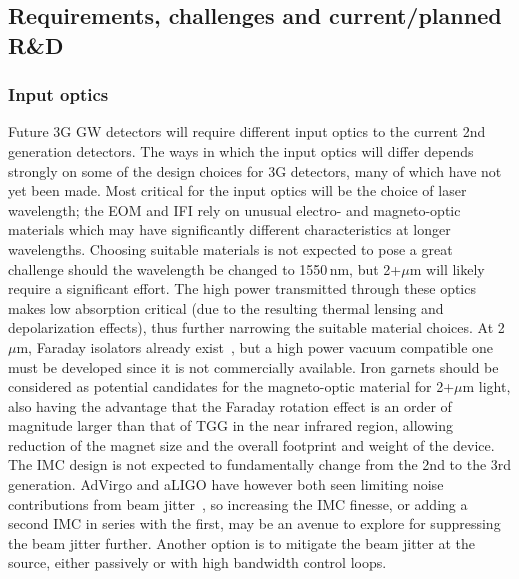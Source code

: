 %
%
%
%
\subsection{Requirements, challenges and current/planned R\&D}
\subsubsection{Input optics}
Future 3G GW detectors will require different input optics to the current 2nd generation detectors. The ways in which the input optics will differ depends strongly on some of the design choices for 3G detectors, many of which have not yet been made. Most critical for the input optics will be the choice of laser wavelength; the EOM and IFI rely on unusual electro- and magneto-optic materials which may have significantly different characteristics at longer wavelengths. Choosing suitable materials is not expected to pose a great challenge should the wavelength be changed to 1550\,nm, but 2+$\mu$m will likely require a significant effort. The high power transmitted through these optics makes low absorption critical (due to the resulting thermal lensing and depolarization effects), thus further narrowing the suitable material choices. At 2$\mu$m, Faraday isolators already exist~\cite{EOTFI}, but a high power vacuum compatible one must be developed since it is not commercially available. Iron garnets should be considered as potential candidates for the magneto-optic material for 2+$\mu$m light, also
having the advantage that the Faraday rotation effect is an order of magnitude larger than that of TGG in the near infrared region, allowing reduction of the magnet size and the overall footprint and weight of the device.
The IMC design is not expected to fundamentally change from the 2nd to the 3rd generation. AdVirgo and aLIGO have however both seen limiting noise contributions from beam jitter~\cite{aLIGOjitter,adVirgojitter}, so increasing the IMC finesse, or adding a second IMC in series with the first, may be an avenue to explore for suppressing the beam jitter further. Another option is to mitigate the beam jitter at the source, either passively or with high bandwidth control loops. 

